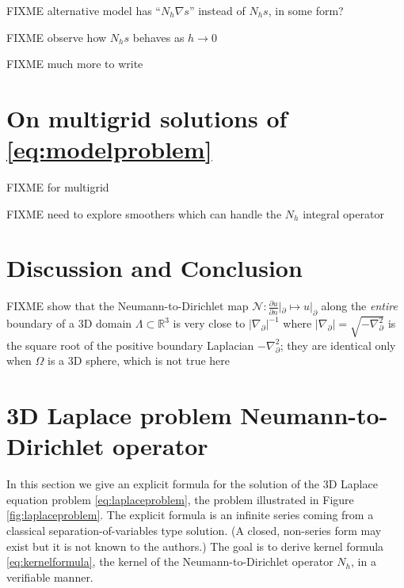\documentclass[letterpaper,final,12pt,reqno]{amsart}
\theoremstyle{cstyle}
\theoremstyle{cstyle*}
\theoremstyle{dstyle}
\newcommand{\RR}{\mathbb{R}}
\newcommand{\grad}{\nabla}
\begin{document}
FIXME alternative model has ``$N_h \grad s$'' instead of $N_h s$, in some form?

FIXME observe how $N_h s$ behaves as $h\to 0$

FIXME much more to write

\section{On multigrid solutions of \eqref{eq:modelproblem}} \label{sec:numerical}

FIXME \cite{Briggsetal2000,Bueler2021,Trottenbergetal2001} for multigrid

FIXME need to explore smoothers which can handle the $N_h$ integral operator

\section{Discussion and Conclusion} \label{sec:conclusion}

FIXME \cite{Girouardetal2022} show that the Neumann-to-Dirichlet map $\mathcal{N}:\frac{\partial u}{\partial n}|_{\partial} \mapsto u|_{\partial}$ along the \emph{entire} boundary of a 3D domain $\Lambda \subset \RR^3$ is very close to $|\grad_{\partial}|^{-1}$ where $|\grad_{\partial}| = \sqrt{-\grad_{\partial}^2}$ is the square root of the positive boundary Laplacian $-\grad_{\partial}^2$; they are identical only when $\Omega$ is a 3D sphere, which is not true here





\appendix
\section{3D Laplace problem Neumann-to-Dirichlet operator}

In this section we give an explicit formula for the solution of the 3D Laplace equation problem \eqref{eq:laplaceproblem}, the problem illustrated in Figure \ref{fig:laplaceproblem}.  The explicit formula is an infinite series coming from a classical separation-of-variables type solution.  (A closed, non-series form may exist but it is not known to the authors.)  The goal is to derive kernel formula \eqref{eq:kernelformula}, the kernel of the Neumann-to-Dirichlet operator $N_h$, in a verifiable manner.
\end{document}
